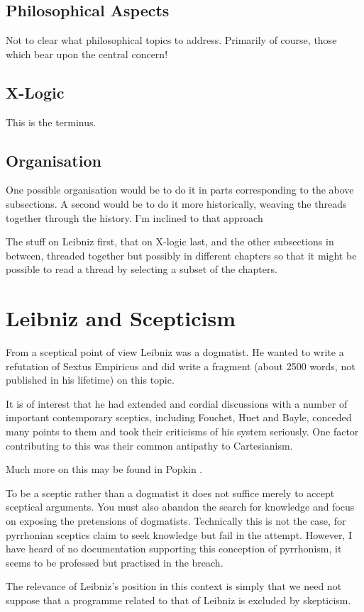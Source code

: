 \documentclass{rbjk}
\begin{document}
\begin{article}
\subsection{Philosophical Aspects}

Not to clear what philosophical topics to address.
Primarily of course, those which bear upon the central concern!

\subsection{X-Logic}

This is the terminus.

\subsection{Organisation}

One possible organisation would be to do it in parts corresponding to the above subsections.
A second would be to do it more historically, weaving the threads together through the history.
I'm inclined to that approach

The stuff on Leibniz first, that on  X-logic last, and the other subsections in between, threaded together but possibly in different chapters so that it might be possible to read a thread by selecting a subset of the chapters.

\section{Leibniz and Scepticism}

From a sceptical point of view Leibniz was a dogmatist.
He wanted to write a refutation of Sextus Empiricus and did write a fragment (about 2500 words, not published in his lifetime) on this topic.

It is of interest that he had extended and cordial discussions with a number of important contemporary sceptics, including Fouchet, Huet and Bayle, conceded many points to them and took their criticisms of his system seriously.
One factor contributing to this was their common antipathy to Cartesianism.

Much more on this may be found in Popkin \cite{popkin03}.

To be a sceptic rather than a dogmatist it does not suffice merely to accept sceptical arguments.
You must also abandon the search for knowledge and focus on exposing the pretensions of dogmatists.
Technically this is not the case, for pyrrhonian sceptics claim to seek knowledge but fail in the attempt.
However, I have heard of no documentation supporting this conception of pyrrhonism, it seems to be professed but practised in the breach.

The relevance of Leibniz's position in this context is simply that we need not suppose that a programme related to that of Leibniz is excluded by skepticism.

{\raggedright


} %

\end{article}
\end{document}
